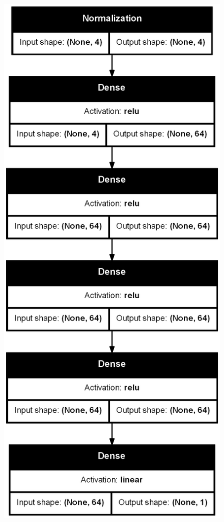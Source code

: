 \begin{figure}[H]
  \centering
  \begin{minipage}{0.4\textwidth}
      \centering
      \includegraphics[width=\linewidth]{images/Results/Neural Net/4HL/structure.png}

\end{minipage}
\end{figure}
